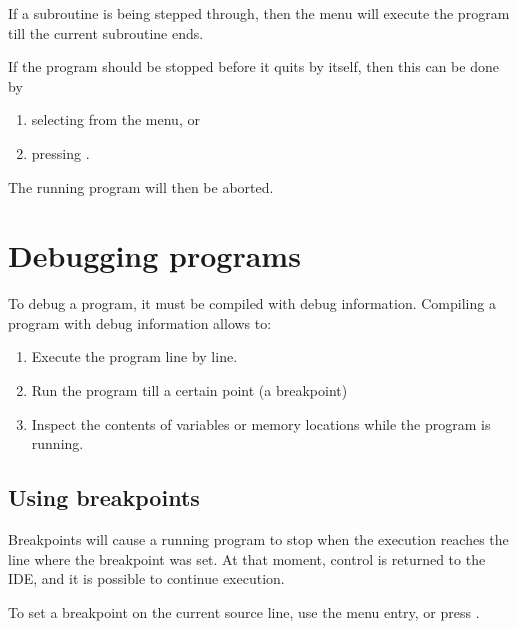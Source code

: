 If a subroutine is being stepped through, then the  menu
will execute the program till the current subroutine ends. 

If the program should be stopped before it quits by itself, then this can be
done by
\begin{enumerate}
\item selecting  from the menu, or
\item pressing .
\end{enumerate}
The running program will then be aborted.

\section{Debugging programs}
\label{se:debugging}
To debug a program, it must be compiled with debug information. Compiling a
program with debug information allows to:
\begin{enumerate}
\item Execute the program line by line.
\item Run the program till a certain point (a breakpoint)
\item Inspect the contents of variables or memory locations while the
program is running.
\end{enumerate}
%
%
\subsection{Using breakpoints}
Breakpoints will cause a running program to stop when the execution
reaches the line where the breakpoint was set. At that moment, control
is returned to the IDE, and it is possible to continue execution.

To set a breakpoint on the current source line, use the 
 menu entry, or press .

